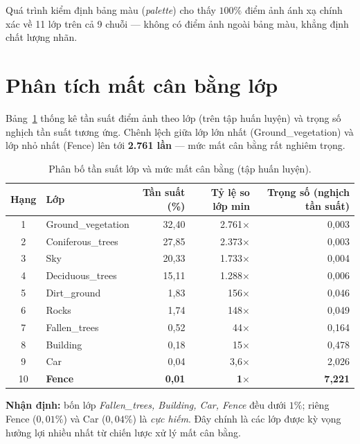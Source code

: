 Quá trình kiểm định bảng màu (\textit{palette}) cho thấy $100\%$ điểm ảnh ánh xạ
chính xác về 11 lớp trên cả 9 chuỗi --- không có điểm ảnh ngoài bảng màu, khẳng định
chất lượng nhãn.

\section{Phân tích mất cân bằng lớp}
\label{sec:imbalance_data}

Bảng~\ref{tab:imbalance} thống kê tần suất điểm ảnh theo lớp (trên tập huấn luyện) và
trọng số nghịch tần suất tương ứng. Chênh lệch giữa lớp lớn nhất
(Ground\_vegetation) và lớp nhỏ nhất (Fence) lên tới \textbf{2.761 lần} --- mức mất
cân bằng rất nghiêm trọng.

\begin{table}[H]
\centering
\caption{Phân bố tần suất lớp và mức mất cân bằng (tập huấn luyện).}
\label{tab:imbalance}
\small
\begin{tabular}{c l r r r}
\toprule
\textbf{Hạng} & \textbf{Lớp} & \textbf{Tần suất (\%)} & \textbf{Tỷ lệ so lớp min} & \textbf{Trọng số (nghịch tần suất)} \\
\midrule
1  & Ground\_vegetation & 32{,}40 & 2.761$\times$ & 0{,}003 \\
2  & Coniferous\_trees  & 27{,}85 & 2.373$\times$ & 0{,}003 \\
3  & Sky                & 20{,}33 & 1.733$\times$ & 0{,}004 \\
4  & Deciduous\_trees   & 15{,}11 & 1.288$\times$ & 0{,}006 \\
5  & Dirt\_ground       & 1{,}83  & 156$\times$   & 0{,}046 \\
6  & Rocks              & 1{,}74  & 148$\times$   & 0{,}049 \\
7  & Fallen\_trees      & 0{,}52  & 44$\times$    & 0{,}164 \\
8  & Building           & 0{,}18  & 15$\times$    & 0{,}478 \\
9  & Car                & 0{,}04  & 3{,}6$\times$ & 2{,}026 \\
10 & \textbf{Fence}     & \textbf{0{,}01} & \textbf{1$\times$} & \textbf{7{,}221} \\
\bottomrule
\end{tabular}
\end{table}

\noindent\textbf{Nhận định:} bốn lớp \textit{Fallen\_trees, Building, Car, Fence}
đều dưới $1\%$; riêng Fence ($0{,}01\%$) và Car ($0{,}04\%$) là \textit{cực hiếm}.
Đây chính là các lớp được kỳ vọng hưởng lợi nhiều nhất từ chiến lược xử lý mất cân
bằng.

